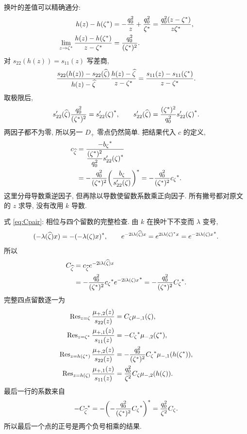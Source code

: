 换叶的差值可以精确通分:
\begin{align*}
h(z)-h({\zeta}^{*})
&=-\dfrac{q_0^2}{z}+\dfrac{q_0^2}{{\zeta}^{*}}
=\dfrac{q_0^2(z-{\zeta}^{*})}{z{\zeta}^{*}},\\
\lim\limits_{z\to{\zeta}^{*}}
\dfrac{h(z)-h({\zeta}^{*})}{z-{\zeta}^{*}}
&=\dfrac{q_0^2}{({\zeta}^{*})^2}.
\end{align*}
对 $s_{22}(h(z))=s_{11}(z)$ 写差商,
\begin{equation*}
\dfrac{s_{22}(h(z))-s_{22}(\widehat\zeta)}{h(z)-\widehat\zeta}
\dfrac{h(z)-\widehat\zeta}{z-{\zeta}^{*}}
=\dfrac{s_{11}(z)-s_{11}({\zeta}^{*})}{z-{\zeta}^{*}}.
\end{equation*}
取极限后,
\begin{equation*}
s_{22}'(\widehat\zeta)\dfrac{q_0^2}{({\zeta}^{*})^2}
={s_{22}'(\zeta)}^{*},
\qquad
s_{22}'(\widehat\zeta)
=\dfrac{({\zeta}^{*})^2}{q_0^2}{s_{22}'(\zeta)}^{*}.
\end{equation*}
两因子都不为零, 所以另一 $D_+$ 零点仍然简单.
把结果代入 $c$ 的定义,
\begin{align*}
c_{\widehat\zeta}
&=\dfrac{-{b_\zeta}^{*}}
{\dfrac{({\zeta}^{*})^2}{q_0^2}{s_{22}'(\zeta)}^{*}}\\
&=-\dfrac{q_0^2}{({\zeta}^{*})^2}
{\left(\dfrac{b_\zeta}{s_{22}'(\zeta)}\right)}^{*}
=-\dfrac{q_0^2}{({\zeta}^{*})^2}{c_\zeta}^{*}.
\end{align*}
这里分母导数乘逆因子, 但再除以导数使留数系数乘正向因子.
所有撇号都对原文的 $z$ 求导, 没有改用 $k$ 导数.

\par\smallskip\noindent 式 \eqref{eq:Cpair}: 相位与四个留数的完整检查.\quad
由 $k$ 在换叶下不变而 $\lambda$ 变号,
\begin{equation*}
(-\lambda(\widehat\zeta)x)=-{(-\lambda(\zeta)x)}^{*},
\qquad
e^{-2\mathrm{i}\lambda(\widehat\zeta)x}
=e^{2\mathrm{i}{\lambda(\zeta)}^{*}x}
={e^{-2\mathrm{i}\lambda(\zeta)x}}^{*}.
\end{equation*}
所以
\begin{align*}
C_{\widehat\zeta}
&=c_{\widehat\zeta}e^{-2\mathrm{i}\lambda(\widehat\zeta)x}\\
&=-\dfrac{q_0^2}{({\zeta}^{*})^2}{c_\zeta}^{*}
{e^{-2\mathrm{i}\lambda(\zeta)x}}^{*}
=-\dfrac{q_0^2}{({\zeta}^{*})^2}{C_\zeta}^{*}.
\end{align*}
完整四点留数逐一为
\begin{align*}
\operatorname{Res}_{z=\zeta}\dfrac{\mu_{+,2}(z)}{s_{22}(z)}
&=C_\zeta\mu_{-,1}(\zeta),\\
\operatorname{Res}_{z={\zeta}^{*}}\dfrac{\mu_{+,1}(z)}{s_{11}(z)}
&=-{C_\zeta}^{*}\mu_{-,2}({\zeta}^{*}),\\
\operatorname{Res}_{z=h({\zeta}^{*})}\dfrac{\mu_{+,2}(z)}{s_{22}(z)}
&=-\dfrac{q_0^2}{({\zeta}^{*})^2}{C_\zeta}^{*}
\mu_{-,1}(h({\zeta}^{*})),\\
\operatorname{Res}_{z=h(\zeta)}\dfrac{\mu_{+,1}(z)}{s_{11}(z)}
&=\dfrac{q_0^2}{\zeta^2}C_\zeta\mu_{-,2}(h(\zeta)).
\end{align*}
最后一行的系数来自
\begin{equation*}
-{C_{\widehat\zeta}}^{*}
=-{\left(-\dfrac{q_0^2}{({\zeta}^{*})^2}{C_\zeta}^{*}\right)}^{*}
=\dfrac{q_0^2}{\zeta^2}C_\zeta.
\end{equation*}
所以最后一个点的正号是两个负号相乘的结果.


